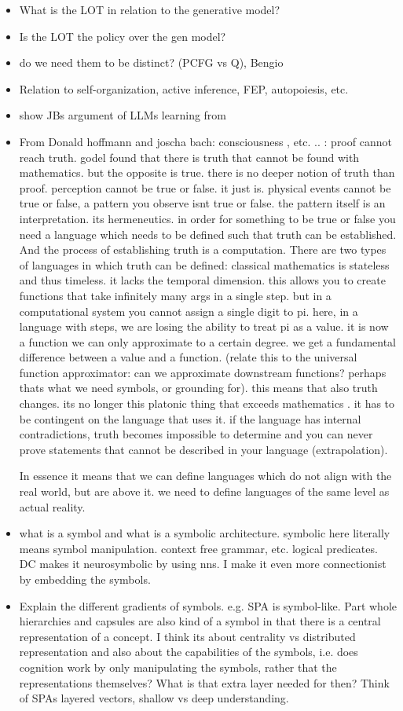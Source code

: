 \begin{itemize}
    \item What is the LOT in relation to the generative model?
    \item Is the LOT the policy over the gen model?
    \item do we need them to be distinct? (PCFG vs Q), Bengio
    \item Relation to self-organization, active inference, FEP, autopoiesis, etc. 
    \item show JBs argument of LLMs learning from 
    \item From Donald hoffmann and joscha bach: consciousness , etc. .. : proof cannot reach truth. godel found that there is truth that cannot be found with mathematics. but the opposite is true. there is no deeper notion of truth than proof. perception cannot be true or false. it just is. physical events cannot be true or false, a pattern you observe isnt true or false. the pattern itself is an interpretation. its hermeneutics. in order for something to be true or false you need a language which needs to be defined such that truth can be established. And the process of establishing truth is a computation. There are two types of languages in which truth can be defined: classical mathematics is stateless and thus timeless. it lacks the temporal dimension. this allows you to create functions that take infinitely many args in a single step. but in a computational system you cannot assign a single digit to pi. here, in a language with steps, we are losing the ability to treat pi as a value. it is now a function we can only approximate to a certain degree. we get a fundamental difference between a value and a function. (relate this to the universal function approximator: can we approximate downstream functions? perhaps thats what we need symbols, or grounding for). this means that also truth changes. its no longer this platonic thing that exceeds mathematics . it has to be contingent on the language that uses it. if the language has internal contradictions, truth becomes impossible to determine and you can never prove statements that cannot be described in your language (extrapolation). 

    In essence it means that we can define languages which do not align with the real world, but are above it. we need to define languages of the same level as actual reality. 
    \item what is a symbol and what is a symbolic architecture. symbolic here literally means symbol manipulation. context free grammar, etc. logical predicates. DC makes it neurosymbolic by using nns. I make it even more connectionist by embedding the symbols.
    \item Explain the different gradients of symbols. e.g. SPA is symbol-like. Part whole hierarchies and capsules are also kind of a symbol in that there is a central representation of a concept. I think its about centrality vs distributed representation and also about the capabilities of the symbols, i.e. does cognition work by only manipulating the symbols, rather that the representations themselves? What is that extra layer needed for then? Think of SPAs layered vectors, shallow vs deep understanding.  
\end{itemize}

